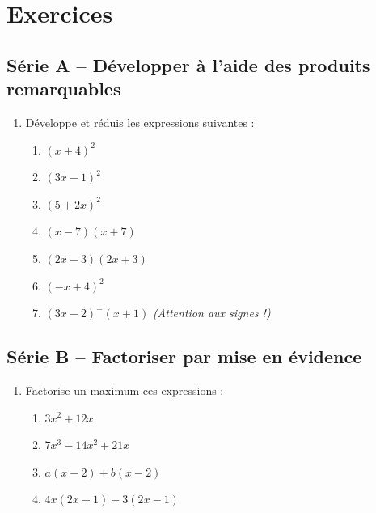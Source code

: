\documentclass[11pt,a4paper]{article}
\begin{document}
\newpage
\section{Exercices}

\subsection{Série A -- Développer à l'aide des produits remarquables}

\begin{enumerate}[label=\textbf{\arabic*.}]

\item Développe et réduis les expressions suivantes :
\begin{enumerate}[label=\alph*)]
  \item $(x + 4)^2$ \qquad
  \item $(3x - 1)^2$ \qquad
  \item $(5 + 2x)^2$ \qquad
  \item $(x - 7)(x + 7)$
  \item $(2x - 3)(2x + 3)$ \qquad
  \item $(-x + 4)^2$ \qquad
  \item $(3x - 2)^-(x+1)$ \textit{(Attention aux signes !)}
\end{enumerate}

\end{enumerate}

\subsection{Série B -- Factoriser par mise en évidence}

\begin{enumerate}[label=\textbf{\arabic*.},start=2]

\item Factorise un maximum ces expressions :
\begin{enumerate}[label=\alph*)]
  \item $3x^2 + 12x$ \qquad
  \item $7x^3 - 14x^2 + 21x$ \qquad
  \item $a(x - 2) + b(x - 2)$ \qquad
  \item $4x(2x - 1) - 3(2x - 1)$
\end{enumerate}

\end{enumerate}
\end{document}
